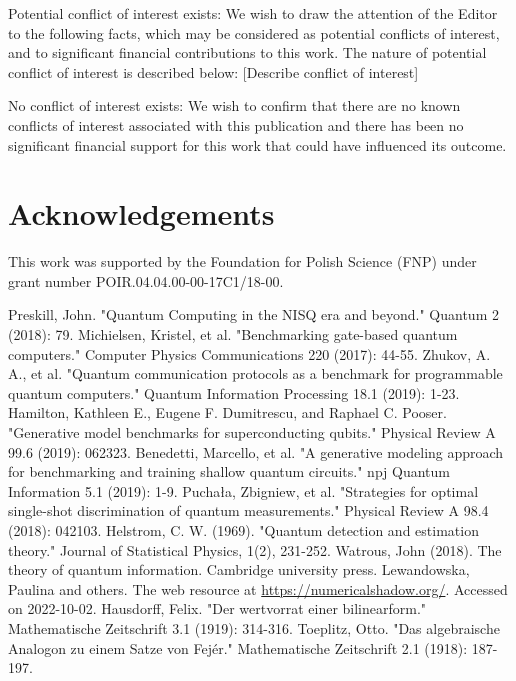 \documentclass[preprint,12pt, a4paper]{elsarticle}
\newcommand{\1}{{\rm 1\hspace{-0.9mm}l}}
\begin{document}
Potential conflict of interest exists:
We wish to draw the attention of the Editor to the following facts, which may 
be considered as potential conflicts of interest, and to significant financial 
contributions to this work. The nature of potential conflict of interest is 
described below: [Describe conflict of interest]

No conflict of interest exists:
We wish to confirm that there are no known conflicts of interest associated 
with this publication and there has been no significant financial support for 
this work that could have influenced its outcome.


\section*{Acknowledgements}

This work was supported by the Foundation for Polish Science (FNP) under grant
number POIR.04.04.00-00-17C1/18-00.


 

\begin{thebibliography}{00}

 Preskill, John. "Quantum Computing in the NISQ era and 
beyond." Quantum 2 (2018): 79.
 Michielsen, Kristel, et al. "Benchmarking 
gate-based quantum computers." Computer Physics Communications 220 (2017): 
44-55.
 Zhukov, A. A., et al. "Quantum communication 
protocols as a benchmark for programmable quantum computers." Quantum 
Information Processing 18.1 (2019): 1-23.
 Hamilton, Kathleen E., Eugene F. Dumitrescu, 
and Raphael C. Pooser. "Generative model benchmarks for superconducting 
qubits." Physical Review A 99.6 (2019): 062323.
 Benedetti, Marcello, et al. "A generative 
modeling approach for benchmarking and training shallow quantum circuits." npj 
Quantum Information 5.1 (2019): 1-9.
 Puchała, Zbigniew, et al. "Strategies for 
optimal single-shot discrimination of quantum measurements." Physical Review A 
98.4 (2018): 042103.
 Helstrom, C. W. (1969). "Quantum detection and estimation theory." Journal of Statistical Physics, 1(2), 231-252.
 Watrous, John (2018). The theory of quantum information. Cambridge university press.
 Lewandowska, Paulina and others. The web resource at \url{https://numericalshadow.org/}. Accessed on 2022-10-02. 
 Hausdorff, Felix. "Der wertvorrat einer bilinearform." Mathematische Zeitschrift 3.1 (1919): 314-316.
 Toeplitz, Otto. "Das algebraische Analogon zu einem Satze von Fejér." Mathematische Zeitschrift 2.1 (1918): 187-197.
\end{thebibliography}
\end{document}
